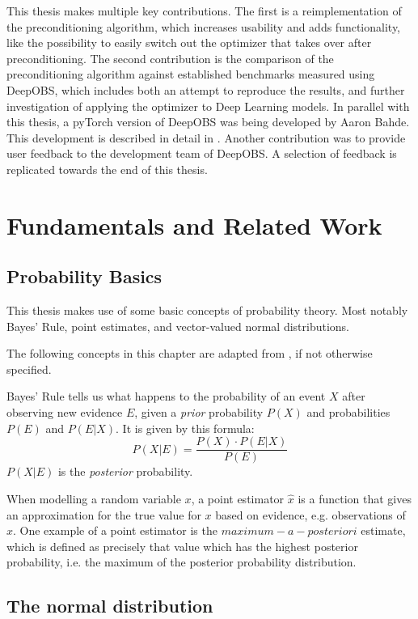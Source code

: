 \documentclass[twoside,12pt,a4paper]{report}
\begin{document}
This thesis makes multiple key contributions. The first is a reimplementation of the preconditioning algorithm, which increases usability and adds functionality, like the possibility to easily switch out the optimizer that takes over after preconditioning. The second contribution is the comparison of the preconditioning algorithm against established benchmarks measured using DeepOBS, which includes both an attempt to reproduce the results, and further investigation of applying the optimizer to Deep Learning models.
In parallel with this thesis, a pyTorch version of DeepOBS was being developed by Aaron Bahde. This development is described in detail in \cite{abahde}. Another contribution was to provide user feedback to the development team of DeepOBS. A selection of feedback is replicated towards the end of this thesis.


\chapter{Fundamentals and Related Work}
\section{Probability Basics}
This thesis makes use of some basic concepts of probability theory. Most notably Bayes' Rule, point estimates, and vector-valued normal distributions.

The following concepts in this chapter are adapted from \cite{bishop2006pattern}, if not otherwise specified.

Bayes' Rule tells us what happens to the probability of an event $X$ after observing new evidence $E$, given a \textit{prior} probability $P(X)$ and probabilities $P(E)$ and $P(E|X)$. It is given by this formula:
$$ P(X|E) = \frac{P(X) \cdot P(E|X)}{P(E)}$$
$P(X|E)$ is the \textit{posterior} probability.

When modelling a random variable $x$, a point estimator $\hat{x}$ is a function that gives an approximation for the true value for $x$ based on evidence, e.g. observations of $x$. One example of a point estimator is the $maximum-a-posteriori$ estimate, which is defined as precisely that value which has the highest posterior probability, i.e. the maximum of the posterior probability distribution.

\section{The normal distribution}
\end{document}
